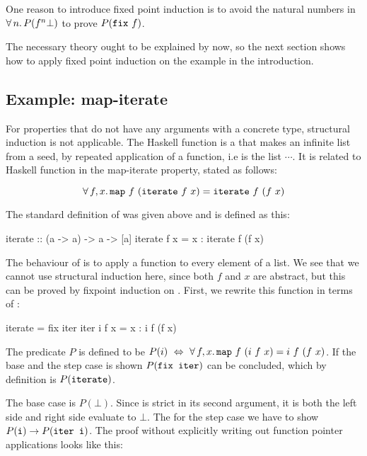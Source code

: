 \noindent
One reason to introduce fixed point induction is to avoid the natural
numbers in $\forall \, n . \, P(f^n \bot)$ to prove $P(\texttt{fix} \,\, f)$.

The necessary theory ought to be explained by now, so the next section
shows how to apply fixed point induction on the example in the
introduction.

\subsection{Example: map-iterate}
\label{sec:mapiter}

For properties that do not have any arguments with a concrete type,
structural induction is not applicable. The Haskell function
 is a that makes an infinite list from a seed, by repeated
application of a function, i.e  is the list
 $\cdots$. It is related to Haskell function
  in the map-iterate property, stated as follows:

\begin{equation*}
\forall \, f , x . \, \texttt{map} \,\, f \,\, (\texttt{iterate} \,\, f \,\, x) =
           \texttt{iterate} \,\, f \,\, (f \,\, x)
\end{equation*}

\noindent
The standard definition of  was given above and 
is defined as this:

\begin{code}
iterate :: (a -> a) -> a -> [a]
iterate f x = x : iterate f (f x)
\end{code}

The behaviour of  is to apply a function to every element of a
list. We see that we cannot use structural induction here, since both
$f$ and $x$ are abstract, but this can be proved by fixpoint induction
on . First, we rewrite this function in terms of :

\begin{code}
iterate = fix iter
iter i f x = x : i f (f x)
\end{code}

\noindent
The predicate $P$ is defined to be $P(i) \,\, \Leftrightarrow \,\,
\forall \, f , x . \, \texttt{map} \,\, f \,\, (i \,\, f \,\, x) = i \,\, f \,\, (f \,\, x)$.
If the base and the step case is shown $P(\texttt{fix iter})$ can be
concluded, which by definition is $P(\texttt{iterate})$.

The base case is $P(\bot)$. Since  is strict in its second
argument, it is both the left side and right side evaluate to $\bot$.
The for the step case we have to show $P(\texttt{i}) \rightarrow
P(\texttt{iter i})$.  The proof without explicitly writing out function
pointer applications looks like this:

